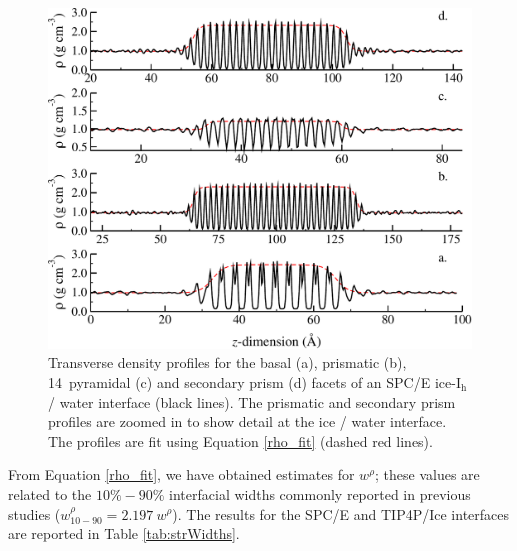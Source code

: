 \begin{figure}
\includegraphics[width=\linewidth]{Figures/transDensity}
\caption{\label{fig:transDensity}Transverse density profiles for the
  basal (a), prismatic (b), 14\degree~pyramidal (c) and secondary prism (d)
  facets of an SPC/E ice-I$_\mathrm{h}$ / water interface (black
  lines). The prismatic and secondary prism profiles are zoomed in to
  show detail at the ice / water interface. The profiles are fit using
  Equation \eqref{rho_fit} (dashed red lines).}
\end{figure}

From Equation \eqref{rho_fit}, we have obtained estimates for
$w^{\rho}$; these values are related to the $10\%-90\%$ interfacial
widths commonly reported in previous studies
($w_\mathrm{10-90}^{\rho} = 2.197~w^{\rho}$).\cite{Bryk2002,Bryk2004}
The results for the SPC/E and TIP4P/Ice interfaces are reported in
Table \ref{tab:strWidths}.

